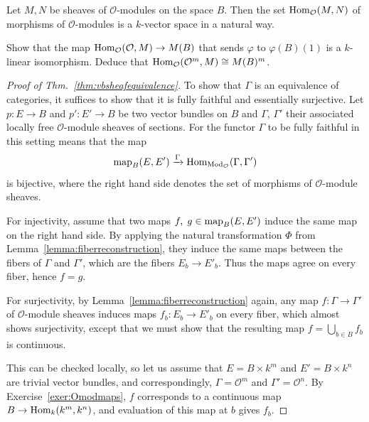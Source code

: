 \documentclass[a4paper,openany]{scrbook}
\begin{document}
Let  $M,N$ be sheaves of $\mathcal O$-modules on the space $B$. Then the set $\operatorname{Hom}_{\mathcal O} (M,N)$ of morphisms of $\mathcal{O}$-modules is a $k$-vector space in a natural way. 

\begin{exer}
	\label{exer:Omodmaps}
	Show that the map $\operatorname{Hom}_{\mathcal O} (\mathcal O,M) \to M(B)$ that sends $\varphi$ to $\varphi(B)(1)$ is a $k$-linear isomorphism. Deduce that $\operatorname{Hom}_{\mathcal O} (\mathcal O^m,M) \cong M(B)^m$.
\end{exer}	

\begin{proof}[Proof of Thm.~\ref{thm:vbsheafequivalence}]
To show that $\Gamma$ is an equivalence of categories, it suffices to show that it is fully faithful and essentially surjective. Let $p\colon E \to B$ and $p'\colon E' \to B$ be two vector bundles on $B$ and $\Gamma$, $\Gamma'$ their associated locally free $\mathcal O$-module sheaves of sections. For the functor $\Gamma$ to be fully faithful in this setting means that the map
\[
\operatorname{map}_B(E,E') \xrightarrow{\Gamma} \operatorname{Hom}_{\operatorname{Mod}_{\mathcal O}}(\Gamma,\Gamma')
\]
is bijective, where the right hand side denotes the set of morphisms of $\mathcal O$-module sheaves.

For injectivity, assume that two maps $f,\; g \in \operatorname{map}_B(E,E')$ induce the same map on the right hand side. By applying the natural transformation $\Phi$ from Lemma~\ref{lemma:fiberreconstruction}, they induce the same maps between the fibers of $\Gamma$ and $\Gamma'$, which are the fibers $E_b \to E'_b$. Thus the maps agree on every fiber, hence $f=g$.

For surjectivity, by Lemma~\ref{lemma:fiberreconstruction} again, any map $f\colon \Gamma \to \Gamma'$ of $\mathcal O$-module sheaves induces maps $f_b\colon E_b \to E'_b$ on every fiber, which almost shows surjectivity, except that we must show that the resulting map $f = \bigcup_{b \in B} f_b$ is continuous.

This can be checked locally, so let us assume that $E = B \times k^m$ and $E' = B \times k^n$ are trivial vector bundles, and correspondingly, $\Gamma = \mathcal O^m$ and $\Gamma' = \mathcal O^n$. By Exercise~\ref{exer:Omodmaps}, $f$ corresponds to a continuous map $B \to \operatorname{Hom}_k(k^m,k^n)$, and evaluation of this map at $b$ gives $f_b$.


\end{proof}
\end{document}
